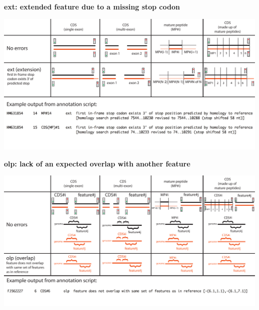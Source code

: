 \documentclass[landscape]{slides}
\begin{document}
\begin{slide}
\begin{center}
\textbf{ext: extended feature due to a missing stop codon}
\vspace{0.5in}

\includegraphics[width=10in]{figs/errornew-2-ext}
\end{center}
\vfill
\end{slide}
\begin{slide}
\begin{center}
\textbf{olp: lack of an expected overlap with another feature}
\vspace{0.5in}

\includegraphics[width=10in]{figs/errornew-3-olp}
\end{center}
\vfill
\end{slide}
\end{document}
